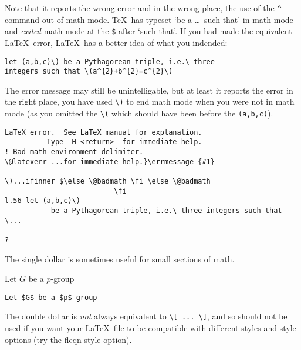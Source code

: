 \documentclass[a4paper]{article}
\newlength{\egwidth}\setlength{\egwidth}{0.45\textwidth}
\newenvironment{eg}%
{\begin{list}{}{\setlength{\leftmargin}{0pt}%
\setlength{\rightmargin}{\leftmargin}}\item[]\footnotesize}%
{\end{list}}
\newenvironment{egbox}%
{\begin{minipage}[t]{\egwidth}}%
{\end{minipage}}
\newcommand{\egstart}{\begin{eg}\begin{egbox}}
\newcommand{\egmid}{\end{egbox}\hfill\begin{egbox}}
\newcommand{\egend}{\end{egbox}\end{eg}}
\begin{document}
Note that it reports the wrong error and in the wrong place, the use of the
\verb|^| command out of math mode. \TeX\ has typeset `be a \ldots\ such that'
in math mode and {\em exited\/} math mode at the \verb|$| after `such that'. 
If you had made the equivalent \LaTeX\ error, \LaTeX\ 
has a better idea of what you indended:
\begin{verbatim}
let (a,b,c)\) be a Pythagorean triple, i.e.\ three 
integers such that \(a^{2}+b^{2}=c^{2}\)
\end{verbatim}
The error message may still be unintelligable, but at least
it reports the error in the right place, you have used \verb|\)|
to end math mode when you were not in math mode (as you omitted the 
\verb|\(| which should have been before the {\tt (a,b,c)}).
\begin{verbatim}
LaTeX error.  See LaTeX manual for explanation.
	      Type  H <return>  for immediate help.
! Bad math environment delimiter.
\@latexerr ...for immediate help.}\errmessage {#1}
						  
\)...ifinner $\else \@badmath \fi \else \@badmath 
						  \fi 
l.56 let (a,b,c)\)
		   be a Pythagorean triple, i.e.\ three integers such that \...

? 
\end{verbatim}

The single dollar is sometimes useful for small
sections of math.
\egstart
Let $G$ be a $p$-group
\egmid
\verb|Let $G$ be a $p$-group|
\egend

The double dollar is {\em not\/} always equivalent to \verb|\[ ... \]|,
and so should not be used if you want your \LaTeX\ file to be compatible
with different styles and style options (try the fleqn style option).

\clearpage

\def\W#1#2{$#1{#2}$ &\tt\string#1\string{#2\string}}
\def\X#1{$#1$ &\tt\string#1}
\def\Y#1{$\big#1$ &\tt\string#1}
\def\Z#1{\tt\string#1}
\end{document}
